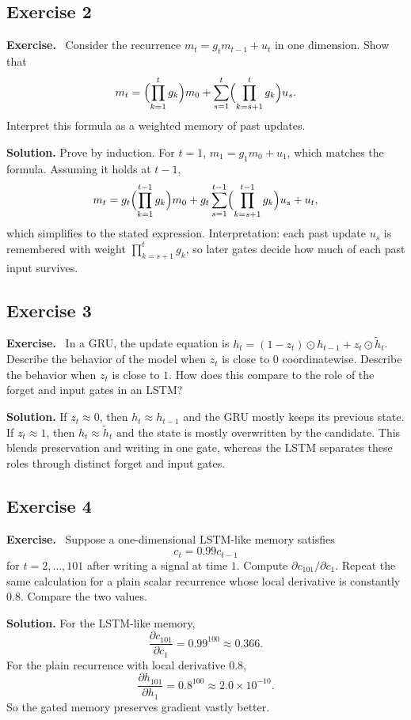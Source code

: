 \documentclass[11pt]{article}
\newenvironment{exercisebox}{\begin{framed}\noindent\textbf{Exercise.}\ }{\end{framed}}
\begin{document}
\subsection*{Exercise 2}
\begin{exercisebox}
Consider the recurrence $m_t=g_t m_{t-1}+u_t$ in one dimension.
Show that
\[
 m_t = \Bigl(\prod_{k=1}^{t} g_k\Bigr)m_0 + \sum_{s=1}^{t}\Bigl(\prod_{k=s+1}^{t} g_k\Bigr)u_s.
\]
Interpret this formula as a weighted memory of past updates.
\end{exercisebox}
\textbf{Solution.} Prove by induction. For $t=1$, $m_1=g_1m_0+u_1$, which matches the formula. Assuming it holds at $t-1$,
\[
m_t=g_t\Bigl(\prod_{k=1}^{t-1}g_k\Bigr)m_0 + g_t\sum_{s=1}^{t-1}\Bigl(\prod_{k=s+1}^{t-1}g_k\Bigr)u_s + u_t,
\]
which simplifies to the stated expression. Interpretation: each past update $u_s$ is remembered with weight $\prod_{k=s+1}^{t}g_k$, so later gates decide how much of each past input survives.

\subsection*{Exercise 3}
\begin{exercisebox}
In a GRU, the update equation is $h_t=(1-z_t)\odot h_{t-1}+z_t\odot \widetilde h_t$.
Describe the behavior of the model when $z_t$ is close to $0$ coordinatewise.
Describe the behavior when $z_t$ is close to $1$.
How does this compare to the role of the forget and input gates in an LSTM?
\end{exercisebox}
\textbf{Solution.} If $z_t\approx 0$, then $h_t\approx h_{t-1}$ and the GRU mostly keeps its previous state. If $z_t\approx 1$, then $h_t\approx \tilde h_t$ and the state is mostly overwritten by the candidate. This blends preservation and writing in one gate, whereas the LSTM separates these roles through distinct forget and input gates.

\subsection*{Exercise 4}
\begin{exercisebox}
Suppose a one-dimensional LSTM-like memory satisfies
\[
 c_t = 0.99 c_{t-1}
\]
for $t=2,\dots,101$ after writing a signal at time $1$.
Compute $\partial c_{101}/\partial c_1$.
Repeat the same calculation for a plain scalar recurrence whose local derivative is constantly $0.8$.
Compare the two values.
\end{exercisebox}
\textbf{Solution.} For the LSTM-like memory,
\[
\frac{\partial c_{101}}{\partial c_1}=0.99^{100}\approx 0.366.
\]
For the plain recurrence with local derivative $0.8$,
\[
\frac{\partial h_{101}}{\partial h_1}=0.8^{100}\approx 2.0\times 10^{-10}.
\]
So the gated memory preserves gradient vastly better.
\end{document}
